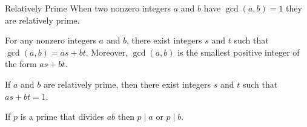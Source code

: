 \documentclass[../butidigress.tex]{subfiles}
\begin{document}
\begin{definition}{Relatively Prime}
When two nonzero integers $a$ and $b$ have $\gcd(a,b)=1$ they are relatively prime.
\end{definition}

\begin{theorem}
For any nonzero integers $a$ and $b$, there exist integers $s$ and $t$ such that $\gcd(a,b) = as+bt$.
Moreover, $\gcd(a, b)$ is the smallest positive integer of the form $as + bt$.
\end{theorem}

\begin{corollary}
If $a$ and $b$ are relatively prime, then there exist integers $s$ and $t$ such that $as+bt=1$.
\end{corollary}

\begin{lemma}
If $p$ is a prime that divides $ab$ then $p\mid a$ or $p\mid b$.
\end{lemma}
\end{document}
